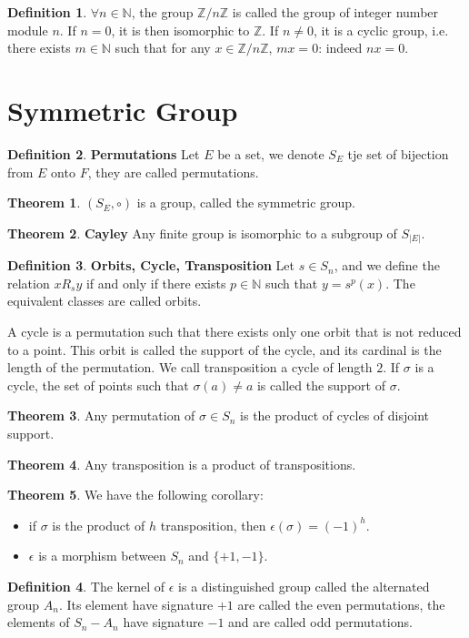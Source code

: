 \documentclass{article}
\theoremstyle{definition}
\newtheorem{defi}{Definition}[subsection]
\newtheorem{theorem}{Theorem}[subsection]
\begin{document}
\begin{defi}
$\forall n\in\mathbb{N}$, the group $\mathbb{Z}/n\mathbb{Z}$ is called the group of integer number module $n$. If $n=0$, it is then isomorphic to $\mathbb{Z}$. If $n\neq 0$, it is a cyclic group, i.e. there exists $m\in\mathbb{N}$ such that for any $x\in \mathbb{Z}/n\mathbb{Z}$, $mx=0$: indeed $nx=0$.
\end{defi}

\section{Symmetric Group}
\begin{defi}
\textbf{Permutations} Let $E$ be a set, we denote $S_E$ tje set of bijection from $E$ onto $F$, they are called permutations.
\end{defi}
\begin{theorem}
$(S_E,\circ)$ is a group, called the symmetric group.
\end{theorem}
\begin{theorem}
\textbf{Cayley} Any finite group is isomorphic to a subgroup of $S_|E|$.
\end{theorem}
\begin{defi}
\textbf{Orbits, Cycle, Transposition} Let $s\in S_n$, and we define the relation $xR_sy$ if and only if there exists $p\in\mathbb{N}$ such that $y=s^{p}(x)$. The equivalent classes are called orbits.

A cycle is a permutation such that there exists only one orbit that is not reduced to a point. This orbit is called the support of the cycle, and its cardinal is the length of the permutation. We call transposition a cycle of length $2$. If $\sigma$ is a cycle, the set of points such that $\sigma(a)\neq a$ is called the support of $\sigma$.
\end{defi}

\begin{theorem}
Any permutation of $\sigma\in S_n$ is the product of cycles of disjoint support. 
\end{theorem}

\begin{theorem}
Any transposition is a product of transpositions.
\end{theorem}

\begin{theorem}
We have the following corollary:
\begin{itemize}
    \item if $\sigma$ is the product of $h$ transposition, then $\epsilon(\sigma)=(-1)^{h}$.
    \item $\epsilon$ is a morphism between $S_n$ and $\{+1,-1\}$.
\end{itemize}
\end{theorem}

\begin{defi}
The kernel of $\epsilon$ is a distinguished group called the alternated group $A_n$. Its element have signature $+1$ are called the even permutations, the elements of $S_n-A_n$ have signature $-1$ and are called odd permutations.
\end{defi}
\end{document}
